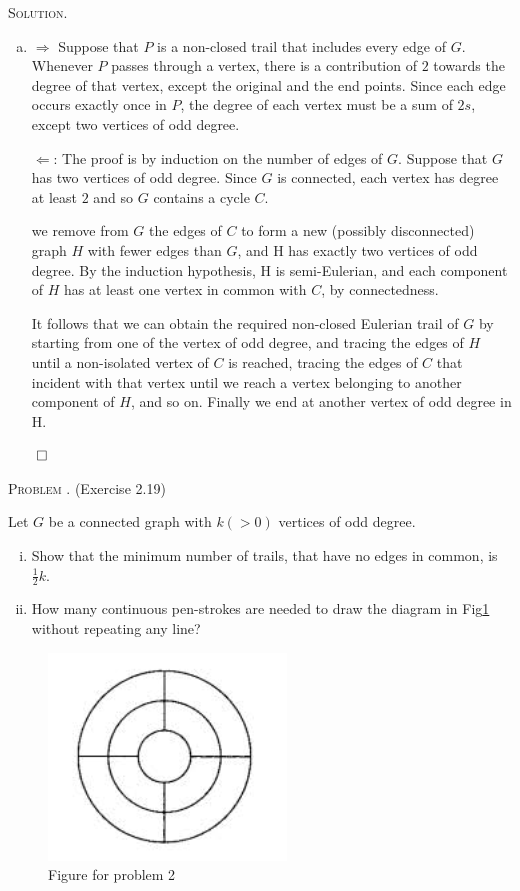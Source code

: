 \documentclass[12pt, a4paper, oneside]{ctexart}
\newcounter{problemname}
\newenvironment{problem}{\begin{framed}\stepcounter{problemname}\par\noindent\textsc{Problem \arabic{problemname}. }}{\end{framed}\par}
\newenvironment{solution}{%
	\par\noindent\textsc{Solution. }\ignorespaces
}{%
	\hfill$\qed$\par
}
\begin{document}
\begin{solution}
\begin{enumerate}[(a)]
			\item $\Rightarrow$ Suppose that $P$ is a non-closed trail that includes every edge of $G$. Whenever $P$ passes through a vertex, there is a 
			contribution of $2$ towards the degree of that vertex, except the original and the end points. Since each edge 
			occurs exactly once in $P$, the degree of each vertex must be a sum of $2s$, except two vertices of odd degree.

			$\Leftarrow$: The proof is by induction on the number of edges of $G$. Suppose that $G$ has two vertices of odd degree.
			Since $G$ is connected, each vertex has degree at least $2$ and so $G$ contains a cycle $C$.

			we remove from $G$ the edges of $C$ to form a new (possibly disconnected) graph $H$ with fewer edges than $G$, and H has exactly two vertices of odd degree.
			By the induction hypothesis, H is semi-Eulerian, and each component of $H$ has at least one vertex in common with $C$, by connectedness. 
			
			It follows that we can obtain the required non-closed
			Eulerian trail of $G$ by starting from one of the vertex of odd degree, and tracing the edges of $H$ until a non-isolated vertex of $C$ is
			reached, tracing the edges of $C$ that incident with that vertex until we reach a vertex belonging to another component of $H$, and so on. Finally we end at another vertex of odd degree in H.
			
		\end{enumerate}
	\end{solution}
		

		
	
	\begin{problem}
		(Exercise 2.19)
		
		Let $G$ be a connected graph with $k(>0)$ vertices of odd degree.

		\begin{enumerate}[(i)]
			\item Show that the minimum number of trails, that have no edges in common, is $\frac{1}{2}k$.
			\item How many continuous pen-strokes are needed to draw the diagram in Fig\ref{fig:problem2} without repeating any line?
		\end{enumerate}
		
		\begin{figure}[H]
			\small
			\centering
			\includegraphics[width=0.25\columnwidth]{figure/fig1.png}
			\caption{Figure for problem 2}
			\label{fig:problem2}
		\end{figure}


	\end{problem}
	
\end{document}
